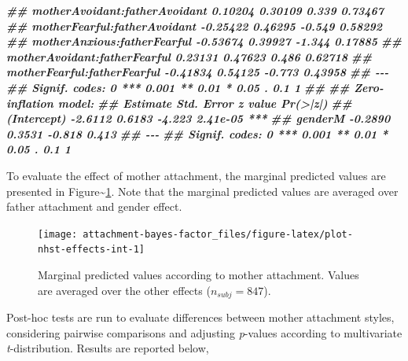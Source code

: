 \documentclass[
]{book}
\newenvironment{Shaded}{\begin{snugshade}}{\end{snugshade}}
\newcommand{\DocumentationTok}[1]{\textcolor[rgb]{0.56,0.35,0.01}{\textbf{\textit{#1}}}}
\begin{document}
\begin{Shaded}
\begin{Highlighting}[]
\DocumentationTok{\#\# motherAvoidant:fatherAvoidant  0.10204    0.30109   0.339  0.73467    }
\DocumentationTok{\#\# motherFearful:fatherAvoidant  {-}0.25422    0.46295  {-}0.549  0.58292    }
\DocumentationTok{\#\# motherAnxious:fatherFearful   {-}0.53674    0.39927  {-}1.344  0.17885    }
\DocumentationTok{\#\# motherAvoidant:fatherFearful   0.23131    0.47623   0.486  0.62718    }
\DocumentationTok{\#\# motherFearful:fatherFearful   {-}0.41834    0.54125  {-}0.773  0.43958    }
\DocumentationTok{\#\# {-}{-}{-}}
\DocumentationTok{\#\# Signif. codes:  0 \textquotesingle{}***\textquotesingle{} 0.001 \textquotesingle{}**\textquotesingle{} 0.01 \textquotesingle{}*\textquotesingle{} 0.05 \textquotesingle{}.\textquotesingle{} 0.1 \textquotesingle{} \textquotesingle{} 1}
\DocumentationTok{\#\# }
\DocumentationTok{\#\# Zero{-}inflation model:}
\DocumentationTok{\#\#             Estimate Std. Error z value Pr(\textgreater{}|z|)    }
\DocumentationTok{\#\# (Intercept)  {-}2.6112     0.6183  {-}4.223 2.41e{-}05 ***}
\DocumentationTok{\#\# genderM      {-}0.2890     0.3531  {-}0.818    0.413    }
\DocumentationTok{\#\# {-}{-}{-}}
\DocumentationTok{\#\# Signif. codes:  0 \textquotesingle{}***\textquotesingle{} 0.001 \textquotesingle{}**\textquotesingle{} 0.01 \textquotesingle{}*\textquotesingle{} 0.05 \textquotesingle{}.\textquotesingle{} 0.1 \textquotesingle{} \textquotesingle{} 1}
\end{Highlighting}
\end{Shaded}

To evaluate the effect of mother attachment, the marginal predicted values are presented in Figure\textasciitilde\ref{fig:plot-nhst-effects-int}. Note that the marginal predicted values are averaged over father attachment and gender effect.

\begin{figure}

{\centering \texttt{[image: attachment-bayes-factor\_files/figure-latex/plot-nhst-effects-int-1]} 

}

\caption{Marginal predicted values according to mother attachment. Values are averaged over the other effects ($n_{subj} = 847$).}\label{fig:plot-nhst-effects-int}
\end{figure}

Post-hoc tests are run to evaluate differences between mother attachment styles, considering pairwise comparisons and adjusting \emph{p}-values according to multivariate \emph{t}-distribution. Results are reported below,
\end{document}
